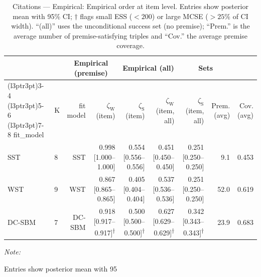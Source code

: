 \begin{table}
\centering
\caption{\label{tab:tab:citations-empirical-emp-item}Citations — Empirical: Empirical order at item level. Entries show posterior mean with 95\% CI; $\dagger$ flags small ESS ($<200$) or large MCSE ($>25\%$ of CI width). “(all)” uses the unconditional success set (no premise); “Prem.” is the average number of premise-satisfying triples and “Cov.” the average premise coverage.}
\centering
\begin{threeparttable}
\begin{tabular}[t]{llrrrrrrr}
\toprule
\multicolumn{2}{c}{ } & \multicolumn{2}{c}{Empirical (premise)} & \multicolumn{2}{c}{Empirical (all)} & \multicolumn{2}{c}{Sets} \\
\cmidrule(l{3pt}r{3pt}){3-4} \cmidrule(l{3pt}r{3pt}){5-6} \cmidrule(l{3pt}r{3pt}){7-8}
fit_model & K & fit model & $\zeta_{\mathrm{W}}$ (item) & $\zeta_{\mathrm{S}}$ (item) & $\zeta_{\mathrm{W}}$ (item, all) & $\zeta_{\mathrm{S}}$ (item, all) & Prem. (avg) & Cov. (avg)\\
\midrule
SST & 8 & SST & 0.998 [1.000--1.000] & 0.554 [0.556--0.556] & 0.451 [0.450--0.450] & 0.251 [0.250--0.250] & 9.1 & 0.453\\
WST & 9 & WST & 0.867 [0.865--0.865] & 0.405 [0.404--0.404] & 0.537 [0.536--0.536] & 0.251 [0.250--0.250] & 52.0 & 0.619\\
DC-SBM & 7 & DC-SBM & 0.918 [0.917--0.917]\textsuperscript{$\dagger$} & 0.500 [0.500--0.500]\textsuperscript{$\dagger$} & 0.627 [0.629--0.629]\textsuperscript{$\dagger$} & 0.342 [0.343--0.343]\textsuperscript{$\dagger$} & 23.9 & 0.683\\
\bottomrule
\end{tabular}
\begin{tablenotes}
\item \textit{Note: } 
\item Entries show posterior mean with 95%
\end{tablenotes}
\end{threeparttable}
\end{table}